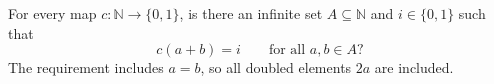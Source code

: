 For every map $c:\mathbb N\to\{0,1\}$, is there an infinite set $A\subseteq\mathbb N$ and $i\in\{0,1\}$ such that
\[c(a+b)=i\qquad\text{for all }a,b\in A?\]
The requirement includes $a=b$, so all doubled elements $2a$ are included.
